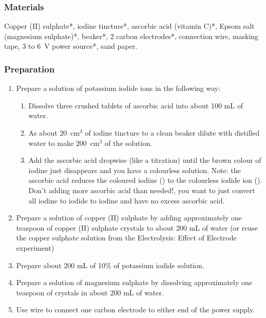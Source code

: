 \subsubsection*{Materials}
Copper (II) sulphate*, iodine tincture*, ascorbic acid (vitamin C)*, Epsom salt (magnesium sulphate)*, beaker*, 2 carbon electrodes*, connection wire, masking tape, 3 to 6~V power source*, sand paper.

\subsubsection*{Preparation}
 \begin{enumerate}
\item{Prepare a solution of potassium iodide ions in the following way:
\begin{enumerate}
\item{Dissolve three crushed tablets of ascorbic acid into about 100 mL of water.}
\item{As about 20~cm$^{3}$ of iodine tincture to a clean beaker dilute with distilled water to make 200~cm$^{3}$ of the solution.}
\item{ Add the ascorbic acid dropwise (like a titration) until the brown colour of iodine just disappears and you have a colourless solution.} Note: the ascorbic acid reduces the coloured iodine () to the colourless iodide ion (). Don't adding more ascorbic acid than needed!, you want to just convert all iodine to iodide to iodine and have no excess ascorbic acid.
\end{enumerate}}

\item{Prepare a solution of copper (II) sulphate by adding approximately one teaspoon of copper (II) sulphate crystals to about 200 mL of water (or reuse the copper sulphate solution from the Electrolysis: Effect of Electrode experiment)}
\item{Prepare about 200 mL of 10\% of potassium iodide solution.}
\item{Prepare a solution of magnesium sulphate by dissolving approximately one teaspoon of crystals in about 200 mL of water.}
\item{Use wire to connect one carbon electrode to either end of the power supply.}

\end{enumerate}

